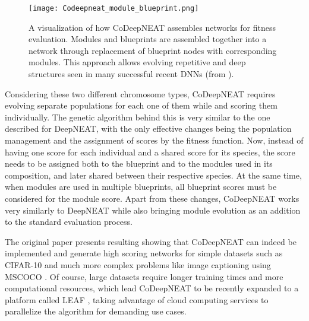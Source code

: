 \documentclass[12pt]{article}
\begin{document}
\begin{figure}[ht]
    \centering
    \hfill
        \strut\vspace*{-\baselineskip}\newline\centering
        \texttt{[image: Codeepneat\_module\_blueprint.png]}
        \caption{A visualization of how CoDeepNEAT assembles networks for fitness evaluation. Modules and blueprints are assembled together into a network through replacement of blueprint nodes with corresponding modules. This approach allows evolving repetitive and deep structures seen in many successful recent DNNs (from \cite{DBLP:journals/corr/MiikkulainenLMR17}).}
        \label{fig:codeepneatmoduleblueprint}
\end{figure}

Considering these two different chromosome types, CoDeepNEAT requires evolving separate populations for each one of them while and scoring them individually. The genetic algorithm behind this is very similar to the one described for DeepNEAT, with the only effective changes being the population management and the assignment of scores by the fitness function. Now, instead of having one score for each individual and a shared score for its species, the score needs to be assigned both to the blueprint and to the modules used in its composition, and later shared between their respective species. At the same time, when modules are used in multiple blueprints, all blueprint scores must be considered for the module score. Apart from these changes, CoDeepNEAT works very similarly to DeepNEAT while also bringing module evolution as an addition to the standard evaluation process.

The original paper presents resulting showing that CoDeepNEAT can indeed be implemented and generate high scoring networks for simple datasets such as CIFAR-10 and much more complex problems like image captioning using MSCOCO  \cite{DBLP:journals/corr/ChenFLVGDZ15}. Of course, large datasets require longer training times and more computational resources, which lead CoDeepNEAT to be recently expanded to a platform called LEAF \cite{2019arXiv190206827L}, taking advantage of cloud computing services to parallelize the algorithm for demanding use cases.


\end{document}
